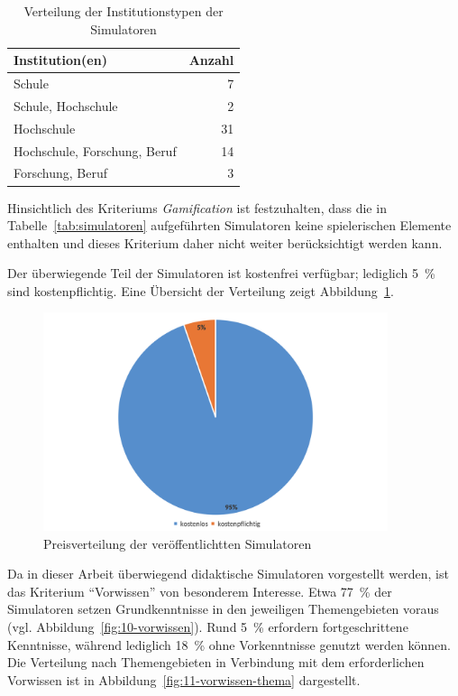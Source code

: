 \begin{table}[h]
	\centering
	\caption{Verteilung der Institutionstypen der Simulatoren}
	\label{tab:institutionen}
	\begin{tabular}{l r}
		\toprule
		\textbf{Institution(en)} & \textbf{Anzahl} \\
		\midrule
		Schule                        & 7  \\
		Schule, Hochschule            & 2  \\
		Hochschule                    & 31 \\
		Hochschule, Forschung, Beruf  & 14 \\
		Forschung, Beruf              & 3  \\
		\bottomrule
	\end{tabular}
\end{table}

Hinsichtlich des Kriteriums \textit{Gamification} ist festzuhalten, dass die in Tabelle~\ref{tab:simulatoren} aufgeführten Simulatoren keine spielerischen Elemente enthalten und dieses Kriterium daher nicht weiter berücksichtigt werden kann.  

Der überwiegende Teil der Simulatoren ist kostenfrei verfügbar; lediglich 5~\% sind kostenpflichtig. Eine Übersicht der Verteilung zeigt Abbildung~\ref{fig:9-preis}.

\begin{figure}[!htbp]
    \centering
    \includegraphics[width=0.90\textwidth]{graphics_sim/9-preis.png}
    \caption{Preisverteilung der veröffentlichtten Simulatoren}
    \label{fig:9-preis}
\end{figure}

Da in dieser Arbeit überwiegend didaktische Simulatoren vorgestellt werden, ist das Kriterium \enquote{Vorwissen} von besonderem Interesse. Etwa 77~\% der Simulatoren setzen Grundkenntnisse in den jeweiligen Themengebieten voraus (vgl. Abbildung~\ref{fig:10-vorwissen}). Rund 5~\% erfordern fortgeschrittene Kenntnisse, während lediglich 18~\% ohne Vorkenntnisse genutzt werden können. Die Verteilung nach Themengebieten in Verbindung mit dem erforderlichen Vorwissen ist in Abbildung~\ref{fig:11-vorwissen-thema} dargestellt.

